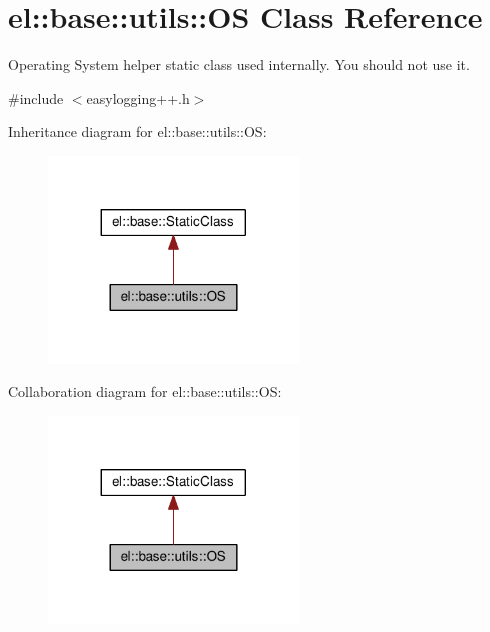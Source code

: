 \hypertarget{classel_1_1base_1_1utils_1_1_o_s}{}\section{el\+:\+:base\+:\+:utils\+:\+:OS Class Reference}
\label{classel_1_1base_1_1utils_1_1_o_s}


Operating System helper static class used internally. You should not use it.  




{\ttfamily \#include $<$easylogging++.\+h$>$}



Inheritance diagram for el\+:\+:base\+:\+:utils\+:\+:OS\+:
\nopagebreak
\begin{figure}[H]
\begin{center}
\leavevmode
\includegraphics[width=188pt]{classel_1_1base_1_1utils_1_1_o_s__inherit__graph}
\end{center}
\end{figure}


Collaboration diagram for el\+:\+:base\+:\+:utils\+:\+:OS\+:
\nopagebreak
\begin{figure}[H]
\begin{center}
\leavevmode
\includegraphics[width=188pt]{classel_1_1base_1_1utils_1_1_o_s__coll__graph}
\end{center}
\end{figure}

